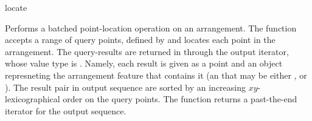 \ccRefPageBegin

\begin{ccRefFunction}{locate}

\ccDefinition

Performs a batched point-location operation on an arrangement.
The function accepts a range of query points, defined by
\ccc{[points_begin, points_end)} and locates each point in the
arrangement. The query-results are returned in through the output iterator,
whose value type is . Namely, each
result is given as a point and an object represneting the arrangement
feature that contains it (an  that may be either
,  or
). The result pair in output sequence are sorted
by an increasing $xy$-lexicographical order on the query points.
The function returns a past-the-end iterator for the output sequence.



\end{ccRefFunction}

\ccRefPageEnd
